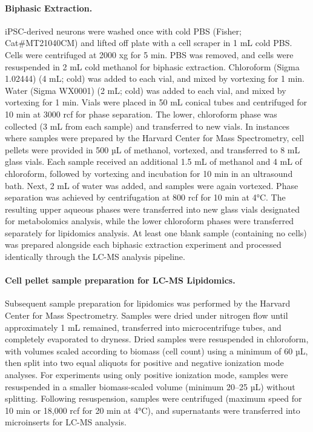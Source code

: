 \documentclass[12pt]{article}
\begin{document}
\paragraph{Biphasic Extraction.} 
iPSC-derived neurons were washed once with cold PBS (Fisher; Cat\#MT21040CM) and lifted off plate with a cell scraper in 1 mL cold PBS. Cells were centrifuged at 2000 xg for 5 min. PBS was removed, and cells were resuspended in 2 mL cold methanol for biphasic extraction. Chloroform (Sigma 1.02444) (4 mL; cold) was added to each vial, and mixed by vortexing for 1 min. Water (Sigma WX0001) (2 mL; cold) was added to each vial, and mixed by vortexing for 1 min. Vials were placed in 50 mL conical tubes and centrifuged for 10 min at 3000 rcf for phase separation. The lower, chloroform phase was collected (3 mL from each sample) and transferred to new vials. 
In instances where samples were prepared by the Harvard Center for Mass Spectrometry, cell pellets were provided in 500 µL of methanol, vortexed, and transferred to 8 mL glass vials. Each sample received an additional 1.5 mL of methanol and 4 mL of chloroform, followed by vortexing and incubation for 10 min in an ultrasound bath. Next, 2 mL of water was added, and samples were again vortexed. Phase separation was achieved by centrifugation at 800 rcf for 10 min at 4°C. The resulting upper aqueous phases were transferred into new glass vials designated for metabolomics analysis, while the lower chloroform phases were transferred separately for lipidomics analysis.
At least one blank sample (containing no cells) was prepared alongside each biphasic extraction experiment and processed identically through the LC-MS analysis pipeline.

\paragraph{Cell pellet sample preparation for LC-MS Lipidomics.} 
Subsequent sample preparation for lipidomics was performed by the Harvard Center for Mass Spectrometry. Samples were dried under nitrogen flow until approximately 1 mL remained, transferred into microcentrifuge tubes, and completely evaporated to dryness. Dried samples were resuspended in chloroform, with volumes scaled according to biomass (cell count) using a minimum of 60 µL, then split into two equal aliquots for positive and negative ionization mode analyses. For experiments using only positive ionization mode, samples were resuspended in a smaller biomass-scaled volume (minimum 20–25 µL) without splitting. Following resuspension, samples were centrifuged (maximum speed for 10 min or 18,000 rcf for 20 min at 4°C), and supernatants were transferred into microinserts for LC-MS analysis.
\end{document}
